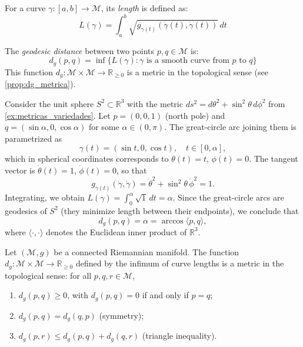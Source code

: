 \begin{definition}\label{def:longitud_curvas}
For a curve $\gamma: [a,b] \to \mathcal{M}$, its \textit{length} is defined as:
\[
L(\gamma) = \int_a^b \sqrt{g_{\gamma(t)}(\dot{\gamma}(t), \dot{\gamma}(t))} \, dt
\]
\end{definition}

\begin{definition}\label{def:distancia_geodesica}
The \textit{geodesic distance} between two points $p, q \in \mathcal{M}$ is:
\[
d_g(p,q) = \inf\{L(\gamma) : \gamma \text{ is a smooth curve from } p \text{ to } q\}
\]
This function $d_g: \mathcal{M} \times \mathcal{M} \to \mathbb{R}_{\geq 0}$ is a metric in the topological sense (see \autoref{prop:dg_metrica}).
\end{definition}

\begin{example}\label{ex:longitud_esfera}
Consider the unit sphere $S^2 \subset \mathbb{R}^3$ with the metric $ds^2 = d\theta^2 + \sin^2\theta\,d\phi^2$ from \autoref{ex:metricas_variedades}. Let $p = (0,0,1)$ (north pole) and $q = (\sin\alpha, 0, \cos\alpha)$ for some $\alpha \in (0, \pi)$. The great-circle arc joining them is parametrized as
\[
\gamma(t) = (\sin t, 0, \cos t), \quad t \in [0, \alpha],
\]
which in spherical coordinates corresponds to $\theta(t) = t$, $\phi(t) = 0$. The tangent vector is $\dot\theta(t) = 1$, $\dot\phi(t) = 0$, so that
\[
g_{\gamma(t)}(\dot\gamma, \dot\gamma) = \dot\theta^2 + \sin^2\theta\,\dot\phi^2 = 1.
\]
Integrating, we obtain $L(\gamma) = \int_0^\alpha \sqrt{1}\,dt = \alpha$. Since the great-circle arcs are geodesics of $S^2$ (they minimize length between their endpoints), we conclude that
\[
d_g(p, q) = \alpha = \arccos\langle p, q \rangle,
\]
where $\langle \cdot, \cdot \rangle$ denotes the Euclidean inner product of $\mathbb{R}^3$.
\end{example}

\begin{proposition}\label{prop:dg_metrica}
Let $(\mathcal{M}, g)$ be a connected Riemannian manifold. The function $d_g: \mathcal{M} \times \mathcal{M} \to \mathbb{R}_{\geq 0}$ defined by the infimum of curve lengths is a metric in the topological sense: for all $p, q, r \in \mathcal{M}$,
\begin{enumerate}
	\item $d_g(p,q) \geq 0$, with $d_g(p,q) = 0$ if and only if $p = q$;
	\item $d_g(p,q) = d_g(q,p)$ (symmetry);
	\item $d_g(p,r) \leq d_g(p,q) + d_g(q,r)$ (triangle inequality).
\end{enumerate}
\end{proposition}

